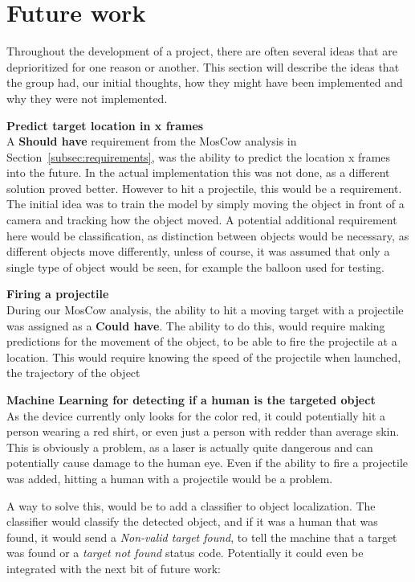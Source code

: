 \section{Future work}\label{sec:futurework}
Throughout the development of a project, there are often several ideas that are deprioritized for one reason or another.
This section will describe the ideas that the group had, our initial thoughts, how they might have been implemented and why they were not implemented.


\textbf{Predict target location in x frames}\\
A \textbf{Should have} requirement from the MosCow analysis in Section~\ref{subsec:requirements}, was the ability to predict the location x frames into the future.
In the actual implementation this was not done, as a different solution proved better.
However to hit a projectile, this would be a requirement.
The initial idea was to train the model by simply moving the object in front of a camera and tracking how the object moved.
A potential additional requirement here would be classification, as distinction between objects would be necessary, as different objects move differently, unless of course, it was assumed that only a single type of object would be seen, for example the balloon used for testing.


\textbf{Firing a projectile}\\
During our MosCow analysis, the ability to hit a moving target with a projectile was assigned as a \textbf{Could have}.
The ability to do this, would require making predictions for the movement of the object, to be able to fire the projectile at a location.
This would require knowing the speed of the projectile when launched, the trajectory of the object


\textbf{Machine Learning for detecting if a human is the targeted object}\\
As the device currently only looks for the color red, it could potentially hit a person wearing a red shirt, or even just a person with redder than average skin.
This is obviously a problem, as a laser is actually quite dangerous and can potentially cause damage to the human eye.
Even if the ability to fire a projectile was added, hitting a human with a projectile would be a problem.

A way to solve this, would be to add a classifier to object localization.
The classifier would classify the detected object, and if it was a human that was found, it would send a \textit{Non-valid target found}, to tell the machine that a target was found or a \textit{target not found} status code.
Potentially it could even be integrated with the next bit of future work:


